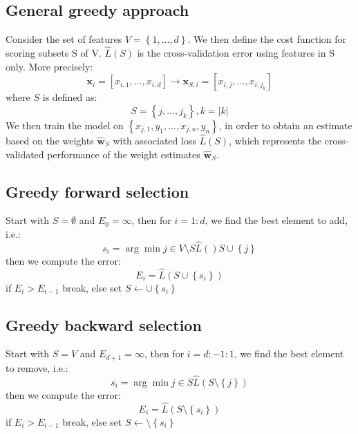 \documentclass[a4paper,10pt,twoside]{article}
\begin{document}
\subsection{General greedy approach}
Consider the set of features $V=\left\{1,\ldots, d\right\}$. We then define the cost function for scoring subsets S of V. $\hat{L}(S)$ is the cross-validation error using features in S only. More precisely: 
\begin{equation*}
    \mathbf{x}_i=[x_{i,1},\ldots,x_{i,d}]\rightarrow\mathbf{x}_{S,i}=[x_{i,j},\ldots,x_{i,j_k}]
\end{equation*}
where $S$ is defined as:
\begin{equation*}
    S=\left\{j,\ldots,j_{k}\right\}, k=|k|
\end{equation*}
We then train the model on $\left\{x_{j,1},y_1,\ldots,x_{j,n},y_n\right\}$, in order to obtain an estimate based on the weights $\hat{\mathbf{w}}_S$ with associated loss $\hat{L}(S)$, which represents the cross-validated performance of the weight estimates $\hat{\mathbf{w}}_S$.

\subsection{Greedy forward selection}
Start with $S=\emptyset$ and $E_0=\infty$, then for $i=1:d$, we find the best element to add, i.e.:
\begin{equation*}
    s_i=\arg\min{j\in V \setminus S}\hat{L}()S\cup \left\{j\right\}
\end{equation*}
then we compute the error:
\begin{equation*}
    E_i=\hat{L}(S\cup\left\{s_i\right\})
\end{equation*}
if $E_i>E_{i-1}$ break, else set $S\leftarrow \cup\left\{s_i\right\}$

\subsection{Greedy backward selection}
Start with $S=V$ and $E_{d+1}=\infty$, then for $i=d:-1:1$, we find the best element to remove, i.e.:
\begin{equation*}
    s_i=\arg\min{j\in S}\hat{L}(S\setminus\left\{j\right\})
\end{equation*}
then we compute the error:
\begin{equation*}
    E_i=\hat{L}(S\setminus\left\{s_i\right\})
\end{equation*}
if $E_i>E_{i-1}$ break, else set $S\leftarrow \setminus\left\{s_i\right\}$
\end{document}
